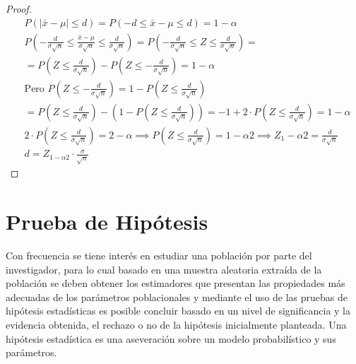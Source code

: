\begin{proof}
    \begin{align*}
         & P\left( \left\lvert\bar{x} -\mu \right\rvert \leq d \right)=P \left( -d\leq \bar{x} -\mu \leq d \right)=1-\alpha                                                                             \\
         & P\left(-\frac{d}{\sigma\sqrt{n}}\leq \frac{\bar{x}-\mu}{\sigma\sqrt{n}}\leq \frac{d}{\sigma\sqrt{n}} \right)=P\left( -\frac{d}{\sigma  \sqrt{n}}\leq Z\leq \frac{d}{\sigma\sqrt{n}} \right)= \\
         & =P\left( Z\leq \frac{d}{\sigma\sqrt{n}} \right)-P\left( Z\leq -\frac{d}{\sigma\sqrt{n}} \right)=1-\alpha                                                                                     \\
         & \text{Pero }P\left(  Z\leq -\frac{d}{\sigma\sqrt{n}}\right)=1-P\left(  Z\leq \frac{d}{\sigma\sqrt{n}}\right)                                                                                 \\
         & =P\left( Z\leq \frac{d}{\sigma\sqrt{n}} \right)-\left( 1-P\left( Z\leq \frac{d}{\sigma\sqrt{n}} \right)\right)=-1+2\cdot P\left( Z\leq \frac{d}{\sigma\sqrt{n}} \right)=1-\alpha             \\
         & 2\cdot P\left( Z\leq \frac{d}{\sigma\sqrt{n}} \right)=2-\alpha  \implies  P\left( Z\leq \frac{d}{\sigma\sqrt{n}} \right)=1-\alpha 2\implies  Z_1-\alpha 2=\frac{d}{\sigma\sqrt{n}}           \\
         & d=Z_{1-\alpha 2}\cdot \frac{\sigma}{\sqrt{n}}
    \end{align*}
\end{proof}


\section{Prueba de Hipótesis}


Con frecuencia se tiene interés en estudiar una población
por parte del investigador, para lo cual basado en una
muestra aleatoria extraída de la población se deben obtener
los estimadores que presentan las propiedades más
adecuadas de los parámetros poblacionales y mediante el
uso de las pruebas de hipótesis estadísticas es posible
concluir basado en un nivel de significancia y la evidencia
obtenida, el rechazo o no de la hipótesis inicialmente
planteada.
Una hipótesis estadística es una aseveración sobre un
modelo probabilístico y sus parámetros.

